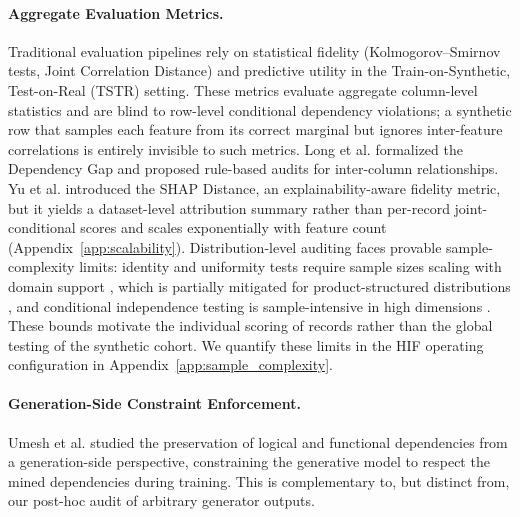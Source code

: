 \documentclass[pdflatex,sn-mathphys-num]{sn-jnl}
\theoremstyle{thmstyleone}%
\theoremstyle{thmstyletwo}%
\theoremstyle{thmstylethree}%
\begin{document}
\paragraph{Aggregate Evaluation Metrics.} Traditional evaluation pipelines rely on statistical fidelity (Kolmogorov--Smirnov tests, Joint Correlation Distance) and predictive utility in the Train-on-Synthetic, Test-on-Real (TSTR) setting. These metrics evaluate aggregate column-level statistics and are blind to row-level conditional dependency violations; a synthetic row that samples each feature from its correct marginal but ignores inter-feature correlations is entirely invisible to such metrics. Long et al. \cite{long2025evaluating} formalized the Dependency Gap and proposed rule-based audits for inter-column relationships. Yu et al. \cite{yu2025shap} introduced the SHAP Distance, an explainability-aware fidelity metric, but it yields a dataset-level attribution summary rather than per-record joint-conditional scores and scales exponentially with feature count (Appendix~\ref{app:scalability}). Distribution-level auditing faces provable sample-complexity limits: identity and uniformity tests require sample sizes scaling with domain support \cite{valiant2014instance,pensia2024sample,paninski2008}, which is partially mitigated for product-structured distributions \cite{bhattacharyya2021testing}, and conditional independence testing is sample-intensive in high dimensions \cite{neykov2021minimax}. These bounds motivate the individual scoring of records rather than the global testing of the synthetic cohort. We quantify these limits in the HIF operating configuration in Appendix~\ref{app:sample_complexity}.

\paragraph{Generation-Side Constraint Enforcement.} Umesh et al. \cite{umesh2025preserving} studied the preservation of logical and functional dependencies from a generation-side perspective, constraining the generative model to respect the mined dependencies during training. This is complementary to, but distinct from, our post-hoc audit of arbitrary generator outputs.
\end{document}

